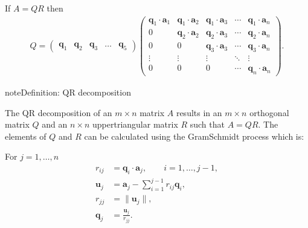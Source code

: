 \documentclass[letterpaper,10pt,english]{jupyterBook}
\begin{document}
\sphinxAtStartPar
If \(A=QR\) then
\begin{align*}
    Q = \begin{pmatrix} \mathbf{q}_1  & \mathbf{q}_2  & \mathbf{q}_3  & \dots  & \mathbf{q}_5 \end{pmatrix}
    \begin{pmatrix}
        \mathbf{q}_1 \cdot \mathbf{a}_1  & \mathbf{q}_1 \cdot \mathbf{a}_2  & \mathbf{q}_1 \cdot \mathbf{a}_3  & \cdots  & \mathbf{q}_1 \cdot \mathbf{a}_n \\
        0 & \mathbf{q}_2 \cdot \mathbf{a}_2  & \mathbf{q}_2 \cdot \mathbf{a}_3  & \cdots  & \mathbf{q}_2 \cdot \mathbf{a}_n \\
        0 & 0 & \mathbf{q}_3 \cdot \mathbf{a}_3  & \cdots  & \mathbf{q}_3 \cdot \mathbf{a}_n \\
        \vdots  & \vdots  & \vdots  & \ddots  & \vdots \\
        0 & 0 & 0 & \cdots  & \mathbf{q}_n \cdot \mathbf{a}_n 
    \end{pmatrix}.
\end{align*}
\begin{sphinxadmonition}{note}{Definition: QR decomposition}

\sphinxAtStartPar
The QR decomposition of an \(m\times n\) matrix \(A\) results in an \(m\times n\) orthogonal matrix \(Q\) and an \(n\times n\) upper\sphinxhyphen{}triangular matrix \(R\) such that \(A =QR\). The elements of \(Q\) and \(R\) can be calculated using the Gram\sphinxhyphen{}Schmidt process which is:

\sphinxAtStartPar
For \(j = 1, \ldots, n\)
\begin{align*}
    r_{ij} &=\mathbf{q}_i \cdot \mathbf{a}_j , \qquad i = 1,\dots ,j-1,\\
    \mathbf{u}_j &= \mathbf{a}_j - \sum_{i=1}^{j-1} r_{ij} \mathbf{q}_i ,\\
    r_{jj} &= \| \mathbf{u}_j \|,\\
    \mathbf{q}_j &=\frac{\mathbf{u}_j }{r_{jj}}.
\end{align*}\end{sphinxadmonition}
\end{document}
